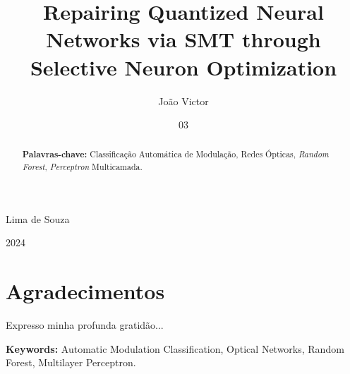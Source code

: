   \title{Repairing Quantized Neural Networks via SMT through Selective Neuron Optimization}
  
  
  \author{João Victor}{Lima de Souza}
  
  \date{03}{2024}


\maketitle

\frontmatter

\thispagestyle{empty}

\dedication{Gostaria de expressar minha gratidão...}

\chapter*{Agradecimentos}
Expresso minha profunda gratidão...

\begin{abstract}


\textbf{Palavras-chave:} Classificação Automática de Modulação, Redes Ópticas, \textit{Random Forest}, \textit{Perceptron} Multicamada.
\end{abstract}

\begin{foreignabstract}


\textbf{Keywords:} Automatic Modulation Classification, Optical Networks, Random Forest, Multilayer Perceptron.
\end{foreignabstract}
   \pagestyle{plain}
   \lhead[\fancyplain{}{\bfseries\tiny\thepage}]{\fancyplain{}{\bfseries\tiny\rightmark}}
   \rhead[\fancyplain{}{\bfseries\tiny\leftmark}]{}

  \tableofcontents
  \listoffigures
  \listoftables